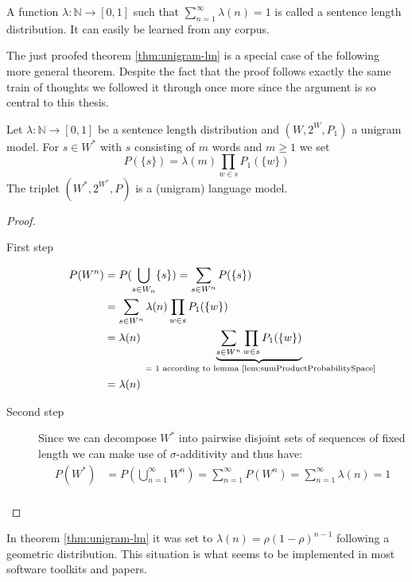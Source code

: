 \documentclass[•]{book}
\begin{document}
\begin{definition}
A function $\lambda:\mathbb{N}\longrightarrow [0,1]$ such that $\sum_{n=1}^\infty \lambda(n) = 1$ is called a sentence length distribution. It can easily be learned from any corpus.
\end{definition}

The just proofed theorem \ref{thm:unigram-lm} is a special case of the following more general theorem. 
Despite the fact that the proof follows exactly the same train of thoughts we followed it through once more since the argument is so central to this thesis.
\begin{theorem}\label{thm:unigramLMPlusSentenceLength}
Let $\lambda:\mathbb{N}\longrightarrow [0,1]$ be a sentence length distribution and $(W,2^W,P_1)$ a unigram model. For $s\in W^{*}$ with $s$ consisting of $m$ words and $m\geq 1$ we set
\begin{equation}
P(\{s\}) = \lambda(m)\prod_{w\in s}P_1(\{w\})
\end{equation}
The triplet $(W^{*},2^{W^{*}},P)$ is a (unigram) language model.
\begin{proof}
\begin{description}
\item[First step] 
\begin{align}
P(W^n) & = P(\bigcup_{s\in W_n} \{s\}) = \sum_{s\in W^n}P(\{s\}) \\
 & = \sum_{s\in W^n}\lambda(n)\prod_{w\in s}P_1(\{w\}) \\
 & = \lambda(n)\underbrace{\sum_{s\in W^n}\prod_{w\in s}P_1(\{w\})}_{\text{ = 1 according to lemma \ref{lem:sumProductProbabilitySpace}}} \\
 & = \lambda(n)
\end{align}

\item[Second step] Since we can decompose $W^{*}$ into pairwise disjoint sets of sequences of fixed length we can make use of $\sigma$-additivity and thus have: 
\begin{align}
P(W^{*}) & = P(\bigcup_{n=1}^\infty W^n) = \sum_{n=1}^\infty P(W^n) = \sum_{n=1}^\infty \lambda(n) = 1 \\
\end{align} 
\end{description}
\end{proof}
\end{theorem}  

\begin{remark}
In theorem \ref{thm:unigram-lm} it was set to $\lambda(n) = \rho(1-\rho)^{n-1}$ following a geometric distribution. 
This situation is what seems to be implemented in most software toolkits and papers. 
\end{remark}
\end{document}
